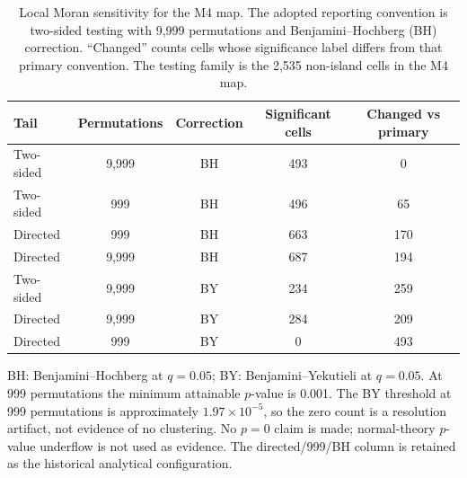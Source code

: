 \begin{table}[H]
\centering
\small
\caption{Local Moran sensitivity for the M4 map. The adopted reporting convention
is two-sided testing with 9,999 permutations and Benjamini--Hochberg (BH)
correction. ``Changed'' counts cells whose significance label differs from that
primary convention. The testing family is the 2,535 non-island cells in the M4
map.}
\label{tab:lisa}
\begin{threeparttable}
\begin{tabular}{@{}lcccc@{}}
\toprule
Tail & Permutations & Correction & Significant cells & Changed vs primary \\
\midrule
Two-sided & 9,999 & BH & 493 & 0 \\
Two-sided & 999 & BH & 496 & 65 \\
Directed & 999 & BH & 663 & 170 \\
Directed & 9,999 & BH & 687 & 194 \\
Two-sided & 9,999 & BY & 234 & 259 \\
Directed & 9,999 & BY & 284 & 209 \\
Directed & 999 & BY & 0 & 493 \\
\bottomrule
\end{tabular}
\begin{tablenotes}[flushleft]\footnotesize
\item BH: Benjamini--Hochberg at $q=0.05$; BY: Benjamini--Yekutieli at $q=0.05$. At 999 permutations the minimum attainable $p$-value is 0.001. The BY threshold at 999 permutations is approximately $1.97\times10^{-5}$, so the zero count is a resolution artifact, not evidence of no clustering. No $p=0$ claim is made; normal-theory $p$-value underflow is not used as evidence. The directed/999/BH column is retained as the historical analytical configuration.
\end{tablenotes}
\end{threeparttable}
\end{table}
